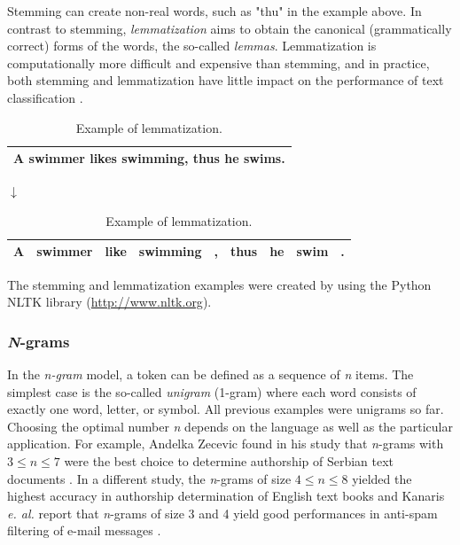 \documentclass{article}
\begin{document}
Stemming can create non-real words, such as "thu" in the example above. In contrast to stemming, \emph{lemmatization} aims to obtain the canonical (grammatically correct) forms of the words, the so-called \emph{lemmas}. Lemmatization is computationally more difficult and expensive than stemming, and in practice, both stemming and lemmatization have little impact on the performance of text classification \cite{toman2006influence}.

\begin{table}[H]
\caption{Example of lemmatization.}
\begin{center}
\begin{tabular}{ | c | }
\hline
A swimmer likes swimming, thus he swims. \\ \hline
\end{tabular}

$\downarrow$

\begin{tabular}{ | c | c | c |  c | c | c | c | c | c | }
\hline
A & swimmer &  like & swimming & , & thus & he & swim & .\\ \hline
\end{tabular}
\end{center}
\end{table}

The stemming and lemmatization examples were created by using the Python NLTK library (\href{http://www.nltk.org}{http://www.nltk.org}).



\subsubsection{\emph{N}-grams}
\label{sec:n-grams} 

In the \emph{n-gram} model, a token can be defined as a sequence of \emph{n} items. The simplest case is the so-called \emph{unigram} (1-gram) where each word consists of exactly one word, letter, or symbol. All previous examples were unigrams so far. Choosing the optimal number \emph{n} depends on the language as well as the particular application. For example, Andelka Zecevic found in his study that \emph{n}-grams with $3 \le n \le 7$ were the best choice to determine authorship of Serbian text documents \cite{zevcevic2011n}. In a different study, the \emph{n}-grams of size $4 \le n \le 8$ yielded the highest accuracy in authorship determination of English text books \cite{kevselj2003n} and Kanaris \emph{e. al.} report that \emph{n}-grams of size 3 and 4 yield good performances in anti-spam filtering of e-mail messages  \cite{kanaris2007words}.
\end{document}
